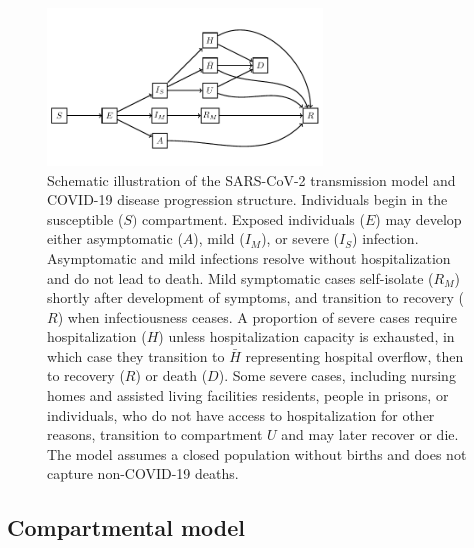 \documentclass[11pt]{article}
\begin{document}
\begin{figure}
	\begin{center}
		\includegraphics[width=0.65\textwidth]{model_diagram_ct.pdf}
	\end{center}
	\caption{Schematic illustration of the SARS-CoV-2 transmission model and COVID-19 disease progression structure.  Individuals begin in the susceptible ($S)$ compartment. Exposed individuals ($E$) may develop either asymptomatic ($A$), mild ($I_M$), or severe ($I_S$) infection. Asymptomatic and mild infections resolve without hospitalization and do not lead to death. Mild symptomatic cases self-isolate ($R_M$) shortly after development of symptoms, and transition to recovery ($R$) when infectiousness ceases. A proportion of severe cases require hospitalization ($H$) unless hospitalization capacity is exhausted, in which case they transition to $\bar{H}$ representing hospital overflow, then to recovery ($R$) or death ($D$). Some severe cases, including nursing homes and assisted living facilities residents, people in prisons, or individuals, who do not have access to hospitalization for other reasons, transition to compartment $U$ and may later recover or die. The model assumes a closed population without births and does not capture non-COVID-19 deaths.}
	\label{fig:model}
\end{figure}



\subsection{Compartmental model}
\end{document}
